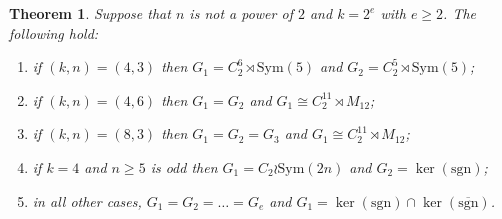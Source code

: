 \documentclass[12pt]{amsart}
\newtheorem{thm}{Theorem}[section]
\theoremstyle{remark}
\theoremstyle{definition}
\newcommand{\sym}{\mathrm{Sym}}
\newcommand{\sh}{\mathrm{Sh}}
\begin{document}
\begin{thm}
\label{lem:identify Gr}
Suppose that $n$ is not a power of $2$ and $k=2^e$ with $e\geqslant 2$. The following hold:
\begin{enumerate}
\item if $(k,n)=(4,3)$ then $G_1 = C_2^6\rtimes \sym(5)$ and $G_2 = C_2^5 \rtimes \sym(5)$;
\item if $(k,n)=(4,6)$ then $G_1 =G_2$ and $G_1 \cong C_2^{11} \rtimes M_{12}$;
\item if $(k,n)=(8,3)$ then $G_1 =G_2= G_3$ and $G_1 \cong C_2^{11} \rtimes M_{12}$;
\item if $k=4$ and $n\geqslant 5$ is odd then $G_1 = C_2 \wr \sym(2n)$ and $G_2 = \ker(\mathrm{sgn})$;
\item in all other cases, $G_1 = G_2 = \dots = G_e$ and $G_1 =\ker(\mathrm{sgn}) \cap \ker( \overline{\mathrm{sgn}})$.
\end{enumerate}
%
\end{thm}
\end{document}
